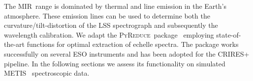 \newcommand{\pyred}{\textsc{PyReduce}}
\newcommand{\met}{\ac{METIS}}
\newcommand{\mir}{\ac{MIR}}
\newcommand{\lss}{\ac{LSS}}
\newcommand{\elt}{\ac{ELT}}
\newcommand{\scope}{\textsc{ScopeSim}}


The \mir~range is dominated by thermal and line emission in the Earth's atmosphere. These emission lines can be used to determine both the curvature/tilt-distortion of the LSS spectrograph and subsequently the wavelength calibration. We adapt the \pyred~package~\cite{pis21} employing state-of-the-art functions for optimal extraction of echelle spectra.  The package works successfully on several ESO instruments and has been adopted for the CRIRES+ pipeline. In the following sections we assess its functionality on simulated \met~ spectroscopic data.


